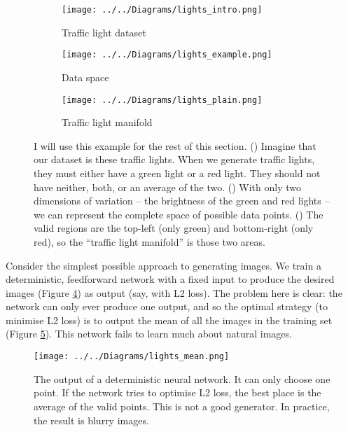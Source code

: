 \documentclass[10pt,a4paper]{article}
\newcommand{\nquote}[1]{``{#1}''}
\begin{document}
\begin{figure}
  \centering
  \vspace{-3cm}
  
      \begin{subfigure}{0.7\columnwidth}
        \centering
        \caption{Traffic light dataset}
        \texttt{[image: ../../Diagrams/lights\_intro.png]} 
        \label{trafficlights:example}
    \end{subfigure}
    \vspace{1cm}
    
    \begin{subfigure}{0.45\columnwidth}
        \centering
        \caption{Data space}
        \texttt{[image: ../../Diagrams/lights\_example.png]} 
        \label{trafficlights:axes}
    \end{subfigure}
    \hfill
    \begin{subfigure}{0.45\columnwidth}
        \centering
        \caption{Traffic light manifold}
        \texttt{[image: ../../Diagrams/lights\_plain.png]} 
        \label{trafficlights:manifold}
    \end{subfigure}
  \caption{I will use this example for the rest of this section. () Imagine that our dataset is these traffic lights. When we generate traffic lights, they must either have a green light or a red light. They should not have neither, both, or an average of the two. () With only two dimensions of variation -- the brightness of the green and red lights -- we can represent the complete space of possible data points. () The valid regions are the top-left (only green) and bottom-right (only red), so the \nquote{traffic light manifold} is those two areas.}
  \label{trafficlights}
\end{figure}

Consider the simplest possible approach to generating images. We train a deterministic, feedforward network with a fixed input to produce the desired images (Figure \ref{trafficlights}) as output (say, with L2 loss). The problem here is clear: the network can only ever produce one output, and so the optimal strategy (to minimise L2 loss) is to output the mean of all the images in the training set (Figure \ref{lightsmean}). This network fails to learn much about natural images.

\begin{figure}
  \centering
  \texttt{[image: ../../Diagrams/lights\_mean.png]}
  \caption{The output of a deterministic neural network. It can only choose one point. If the network tries to optimise L2 loss, the best place is the average of the valid points. This is not a good generator. In practice, the result is blurry images.}
  \label{lightsmean}
\end{figure}
\end{document}
